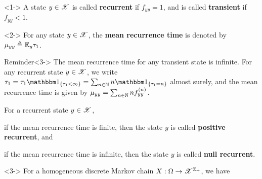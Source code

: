 \documentclass[12pt,aspectratio=169]{beamer}
\begin{document}
\begin{frame}
\begin{Definition}<1->
A state $y\in\mathscr{X}$ is called \textbf{recurrent} if $f_{yy} = 1$, and is called \textbf{transient} if $f_{yy} < 1$. 
\end{Definition}
\begin{Definition}<2->
For any state $y \in \mathscr{X}$, the \textbf{mean recurrence time} is denoted by $\mu_{yy} \triangleq \mathbb{E}_y\tau_1$. 
\end{Definition}
\begin{block}{Reminder}<3->
The mean recurrence time for any transient state is infinite. 
For any recurrent state $y \in \mathscr{X}$, we write $\tau_1 = \tau_1\SetIn{\tau_1 < \infty} = \sum_{n \in \N}n\SetIn{\tau_1=n}$ almost surely, 
and the mean recurrence time is given by $\mu_{yy} = \sum_{n \in \mathbb{N}}nf^{(n)}_{yy}$.   
\end{block}
\end{frame}


\begin{frame}
\begin{Definition} 
For a recurrent state $y \in \mathscr{X}$, 
\begin{compactenum}[(i)]
\item if the mean recurrence time is finite, then the state $y$ is called \textbf{positive recurrent}, and  
\item<2-> if the mean recurrence time is infinite, then the state $y$ is called \textbf{null recurrent}.
\end{compactenum}
\end{Definition}

\begin{prop}<3->
For a homogeneous discrete Markov chain $X: \Omega \to \mathscr{X}^{\mathbb{Z}_+}$, 
we have 
\end{prop}
\end{frame}
\end{document}

